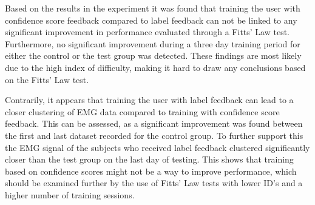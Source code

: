 Based on the results in the experiment it was found that training the user with confidence score feedback compared to label feedback can not be linked to any significant improvement in performance evaluated through a Fitts' Law test. Furthermore, no significant improvement during a three day training period for either the control or the test group was detected. These findings are most likely due to the high index of difficulty, making it hard to draw any conclusions based on the Fitts' Law test. 

Contrarily, it appears that training the user with label feedback can lead to a closer clustering of EMG data compared to training with confidence score feedback. This can be assessed, as a significant improvement was found between the first and last dataset recorded for the control group. To further support this the EMG signal of the subjects who received label feedback clustered significantly closer than the test group on the last day of testing. This shows that training based on confidence scores might not be a way to improve performance, which should be examined further by the use of Fitts' Law tests with lower ID's and a higher number of training sessions. 